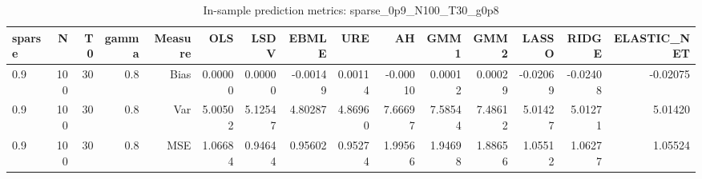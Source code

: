 \begin{table}[!htbp]\centering
\caption{In-sample prediction metrics: sparse_0p9_N100_T30_g0p8}
\label{tab:table2_sparse_0p9_N100_T30_g0p8}
\begin{tabular}{lrrrrrrrrrrrrrr}
\hline
sparse & N & T0 & gamma & Measure & OLS & LSDV & EBMLE & URE & AH & GMM1 & GMM2 & LASSO & RIDGE & ELASTIC_NET \\
\hline
0.9 & 100 & 30 & 0.8 & Bias & 0.00000 & 0.00000 & -0.00149 & 0.00114 & -0.00010 & 0.00012 & 0.00029 & -0.02069 & -0.02408 & -0.02075 \\
0.9 & 100 & 30 & 0.8 & Var & 5.00502 & 5.12547 & 4.80287 & 4.86960 & 7.66697 & 7.58544 & 7.48612 & 5.01427 & 5.01271 & 5.01420 \\
0.9 & 100 & 30 & 0.8 & MSE & 1.06684 & 0.94644 & 0.95602 & 0.95274 & 1.99566 & 1.94698 & 1.88656 & 1.05512 & 1.06277 & 1.05524 \\
\hline
\end{tabular}
\end{table}

